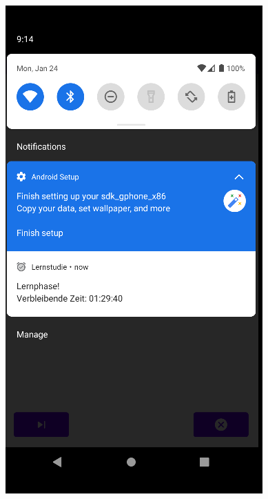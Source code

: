 \documentclass[ngerman]{tutorial}
\begin{document}
\begin{center}
    \includegraphics[scale=0.5]{learn_noti.png}\quad

\end{center}
\end{document}
